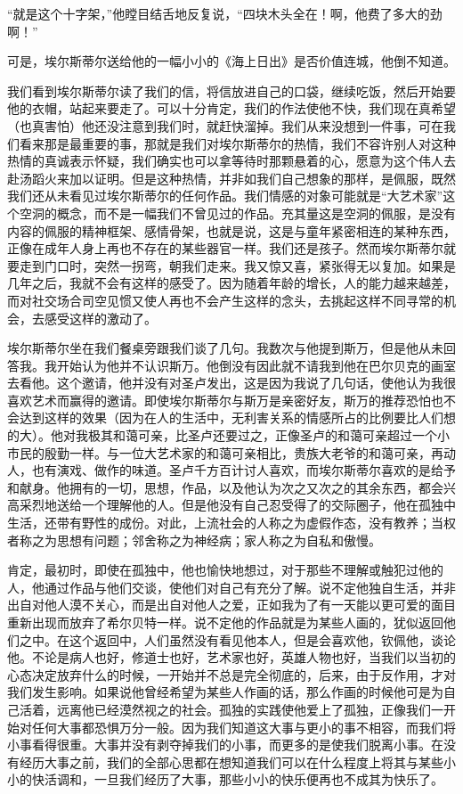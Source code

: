 \par “就是这个十字架，”他瞠目结舌地反复说，“四块木头全在！啊，他费了多大的劲啊！”
\par 可是，埃尔斯蒂尔送给他的一幅小小的《海上日出》是否价值连城，他倒不知道。
\par 我们看到埃尔斯蒂尔读了我们的信，将信放进自己的口袋，继续吃饭，然后开始要他的衣帽，站起来要走了。可以十分肯定，我们的作法使他不快，我们现在真希望（也真害怕）他还没注意到我们时，就赶快溜掉。我们从来没想到一件事，可在我们看来那是最重要的事，那就是我们对埃尔斯蒂尔的热情，我们不容许别人对这种热情的真诚表示怀疑，我们确实也可以拿等待时那颗悬着的心，愿意为这个伟人去赴汤蹈火来加以证明。但是这种热情，并非如我们自己想象的那样，是佩服，既然我们还从未看见过埃尔斯蒂尔的任何作品。我们情感的对象可能就是“大艺术家”这个空洞的概念，而不是一幅我们不曾见过的作品。充其量这是空洞的佩服，是没有内容的佩服的精神框架、感情骨架，也就是说，这是与童年紧密相连的某种东西，正像在成年人身上再也不存在的某些器官一样。我们还是孩子。然而埃尔斯蒂尔就要走到门口时，突然一拐弯，朝我们走来。我又惊又喜，紧张得无以复加。如果是几年之后，我就不会有这样的感受了。因为随着年龄的增长，人的能力越来越差，而对社交场合司空见惯又使人再也不会产生这样的念头，去挑起这样不同寻常的机会，去感受这样的激动了。
\par 埃尔斯蒂尔坐在我们餐桌旁跟我们谈了几句。我数次与他提到斯万，但是他从未回答我。我开始认为他并不认识斯万。他倒没有因此就不请我到他在巴尔贝克的画室去看他。这个邀请，他并没有对圣卢发出，这是因为我说了几句话，使他认为我很喜欢艺术而赢得的邀请。即使埃尔斯蒂尔与斯万是亲密好友，斯万的推荐恐怕也不会达到这样的效果（因为在人的生活中，无利害关系的情感所占的比例要比人们想的大）。他对我极其和蔼可亲，比圣卢还要过之，正像圣卢的和蔼可亲超过一个小市民的殷勤一样。与一位大艺术家的和蔼可亲相比，贵族大老爷的和蔼可亲，再动人，也有演戏、做作的味道。圣卢千方百计讨人喜欢，而埃尔斯蒂尔喜欢的是给予和献身。他拥有的一切，思想，作品，以及他认为次之又次之的其余东西，都会兴高采烈地送给一个理解他的人。但是他没有自己忍受得了的交际圈子，他在孤独中生活，还带有野性的成份。对此，上流社会的人称之为虚假作态，没有教养；当权者称之为思想有问题；邻舍称之为神经病；家人称之为自私和傲慢。
\par 肯定，最初时，即使在孤独中，他也愉快地想过，对于那些不理解或触犯过他的人，他通过作品与他们交谈，使他们对自己有充分了解。说不定他独自生活，并非出自对他人漠不关心，而是出自对他人之爱，正如我为了有一天能以更可爱的面目重新出现而放弃了希尔贝特一样。说不定他的作品就是为某些人画的，犹似返回他们之中。在这个返回中，人们虽然没有看见他本人，但是会喜欢他，钦佩他，谈论他。不论是病人也好，修道士也好，艺术家也好，英雄人物也好，当我们以当初的心态决定放弃什么的时候，一开始并不总是完全彻底的，后来，由于反作用，才对我们发生影响。如果说他曾经希望为某些人作画的话，那么作画的时候他可是为自己活着，远离他已经漠然视之的社会。孤独的实践使他爱上了孤独，正像我们一开始对任何大事都恐惧万分一般。因为我们知道这大事与更小的事不相容，而我们将小事看得很重。大事并没有剥夺掉我们的小事，而更多的是使我们脱离小事。在没有经历大事之前，我们的全部心思都在想知道我们可以在什么程度上将其与某些小小的快活调和，一旦我们经历了大事，那些小小的快乐便再也不成其为快乐了。

